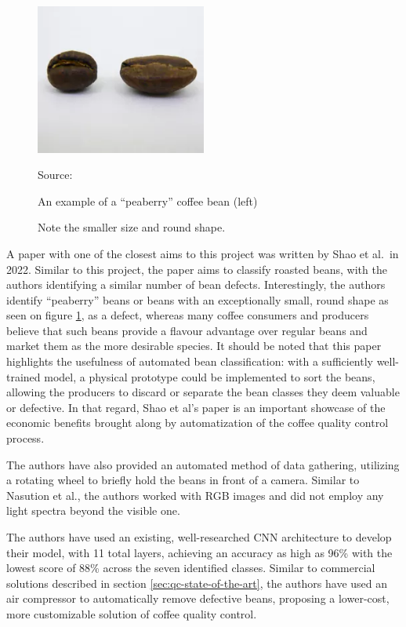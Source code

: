 \begin{figure}
	\includegraphics[width=0.5\textwidth]{figures/litReview/peaberry-vs-normal}
	\caption*
	{Source: \cite{peaberryImg}}
	\caption{An example of a ``peaberry'' coffee bean (left)}
	\caption*
	{Note the smaller size and round shape.} \label{fig:peaberryComparison}
\end{figure}
A paper with one of the closest aims to this project was written by Shao et al.\ in
2022\cite{rgbDeepLearningShao}. Similar to this project, the paper aims to
classify roasted beans, with the authors identifying a similar number of bean defects.
Interestingly, the authors identify ``peaberry'' beans or beans with an exceptionally
small, round shape as seen on figure \ref{fig:peaberryComparison}, as a defect,
whereas many coffee consumers and producers believe that such beans provide a
flavour advantage over regular beans and market them as the more desirable
species. It should be noted that this paper highlights the usefulness of automated
bean classification: with a sufficiently well-trained model, a physical prototype
could be implemented to sort the beans, allowing the producers to discard or
separate the bean classes they deem valuable or defective. In that regard, Shao
et al's paper is an important showcase of the economic benefits brought along by
automatization of the coffee quality control process.

The authors have also provided an automated method of data gathering, utilizing a
rotating wheel to briefly hold the beans in front of a camera. Similar to
Nasution et al.\cite{manyRoastLevelsNasution}, the authors worked with RGB images
and did not employ any light spectra beyond the visible one.

The authors have used an existing, well-researched CNN architecture to develop
their model, with 11 total layers, achieving an accuracy as high as 96\% with the
lowest score of 88\% across the seven identified classes. Similar to commercial solutions
described in section \ref{sec:qc-state-of-the-art}, the authors have used an air
compressor to automatically remove defective beans, proposing a lower-cost, more
customizable solution of coffee quality control.

